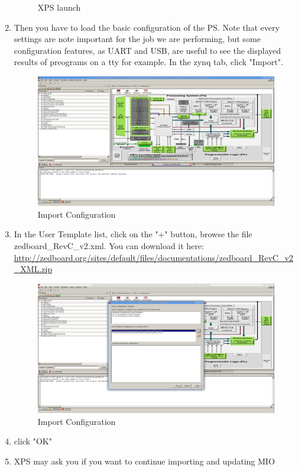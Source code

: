 \documentclass{article}
\begin{document}
\begin{enumerate}
\begin{figure}
	\caption{XPS launch}
	\end{figure}
	\item Then you have to load the basic configuration of the PS. Note that
	every settings are note important for the job we are performing, but some
	configuration features, as UART and USB, are useful to see the displayed
	results of preograms on a tty for example.
	In the zynq tab, click "Import".
	\begin{figure}
	\includegraphics[scale=0.25]{pictures/XPSImport1.png}
	\caption{Import Configuration}
	\end{figure}
	\item In the User Template list, click on the "+" button, browse the file
	zedboard\_RevC\_v2.xml.
	You can download it here:\\
		\url{http://zedboard.org/sites/default/files/documentations/zedboard_RevC_v2_XML.zip}
	\begin{figure}
	\includegraphics[scale=0.25]{pictures/XPSImport2.png}
	\caption{Import Configuration}
	\end{figure}
	\item click "OK"
	\item XPS may ask you if you want to continue importing and updating MIO

\end{enumerate}
\end{document}
